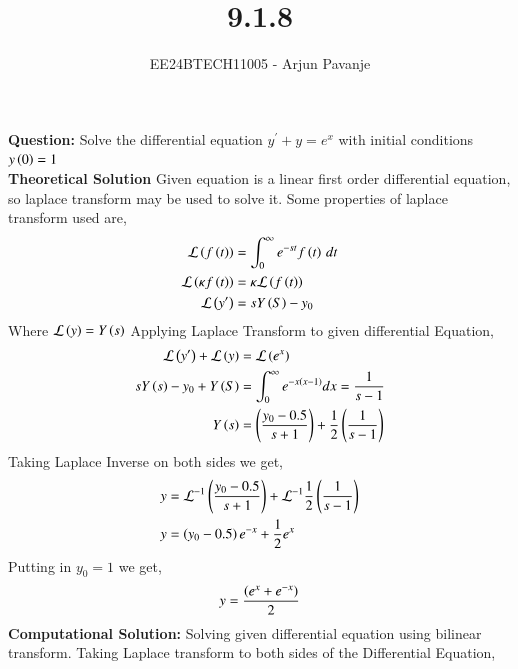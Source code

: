 \documentclass[journal]{IEEEtran}
\begin{document}

\vspace{3cm}

\title{9.1.8}
\author{EE24BTECH11005 - Arjun Pavanje}
{\let\newpage\relax\maketitle}
\textbf{Question:}
Solve the differential equation $y^{\prime}+y=e^x$ with initial conditions $y\left(0\right)=1$
\solution\\

\textbf{Theoretical Solution}\newline
Given equation is a linear first order differential equation, so laplace transform may be used to solve it. Some properties of laplace transform used are,
\begin{align}
  \mathcal{L}\left(f\left(t\right)\right) &= \int_0^{\infty} e^{-st} f\left(t\right) \, dt\\
 \mathcal{L}\left(\kappa f\left(t\right)\right) &= \kappa \mathcal{L}\left(f\left(t\right)\right)\\
  \mathcal{L}\left(y^{\prime}\right) &= sY\left(S\right) - y_0
\end{align}
Where $\mathcal{L}\left(y\right) = Y\left(s\right)$
Applying Laplace Transform to given differential Equation,
\begin{align}
  \mathcal{L}\left(y^{\prime}\right) + \mathcal{L}\left(y\right) &= \mathcal{L}\left(e^{x}\right)\\
  sY\left(s\right) - y_0 + Y\left(S\right) &= \int_0^{\infty} e^{-x\left(x - 1\right) } dx = \frac{1}{s-1}\\
  Y\left(s\right) &= \left(\frac{y_0 - 0.5}{s+1}\right) + \frac{1}{2}\left(\frac{1}{s-1}\right)
 \end{align}
 Taking Laplace Inverse on both sides we get,
 \begin{align}
   y &= \mathcal{L}^{-1}\left(\frac{y_0 - 0.5}{s+1}\right) + \mathcal{L}^{-1}\frac{1}{2}\left(\frac{1}{s-1}\right)\\
   y &= \left(y_0 - 0.5\right)e^{-x} + \frac{1}{2} e^{x}
 \end{align}
 Putting in $y_0 = 1$ we get,
 \begin{align}
   y = \frac{\left(e^{x} + e^{-x}\right)}{2}
 \end{align}\textbf{Computational Solution:}\newline
 Solving given differential equation using bilinear transform.
Taking Laplace transform to both sides of the Differential Equation,
\end{document}
